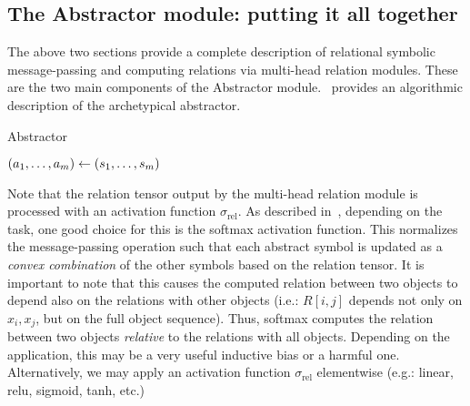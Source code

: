 \subsection{The Abstractor module: putting it all together}

The above two sections provide a complete description of relational symbolic message-passing and computing relations via multi-head relation modules. These are the two main components of the Abstractor module.~ provides an algorithmic description of the archetypical abstractor.

\begin{algorithm}[ht!]
	\caption{Abstractor}\label{alg:abstractor}

	\vspace{1em}

	\((a_1, \ldots, a_m) \gets (s_1, \ldots, s_m)\)

\end{algorithm}

Note that the relation tensor output by the multi-head relation module is processed with an activation function $\sigma_{\mathrm{rel}}$. As described in~, depending on the task, one good choice for this is the softmax activation function. This normalizes the message-passing operation such that each abstract symbol is updated as a \textit{convex combination} of the other symbols based on the relation tensor. It is important to note that this causes the computed relation between two objects to depend also on the relations with other objects (i.e.: $R[i,j]$ depends not only on $x_i, x_j$, but on the full object sequence). Thus, softmax computes the relation between two objects \textit{relative} to the relations with all objects. Depending on the application, this may be a very useful inductive bias or a harmful one. Alternatively, we may apply an activation function $\sigma_{\mathrm{rel}}$ elementwise (e.g.: linear, relu, sigmoid, tanh, etc.)

